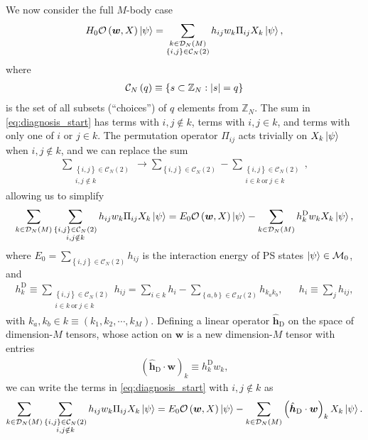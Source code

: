 \documentclass[nofootinbib,notitlepage,11pt]{revtex4-2}
\renewcommand{\t}{\text} %
\newcommand{\p}[1]{\left(#1\right)} %
\renewcommand{\set}[1]{\left\{#1\right\}} %
\renewcommand{\c}{\cdot} %
\newcommand{\m}{\bm} %
\newcommand{\1}{\mathds{1}}
\renewcommand{\i}{\mathrm{i}\mkern1mu}
\newcommand{\C}{\mathcal{C}}
\newcommand{\D}{\mathcal{D}}
\newcommand{\M}{\mathcal{M}}
\renewcommand{\O}{\mathcal{O}}
\newcommand{\ZZ}{\mathbb{Z}}
\begin{document}
We now consider the full $M$-body case
\begin{align}
  H_0 \O\p{\m w,X} \ket\psi
  = \sum_{\substack{k\in\D_N\p{M}\\\set{i,j}\in\C_N\p{2}}}
  h_{ij} w_k \Pi_{ij} X_k \ket\psi,
  \label{eq:diagnosis_start}
\end{align}
where
\begin{align}
  \C_N\p{q} \equiv \set{ s \subset \ZZ_N : \abs{s} = q }
  \label{eq:choices}
\end{align}
is the set of all subsets (``choices'') of $q$ elements from $\ZZ_N$.
The sum in \eqref{eq:diagnosis_start} has terms with $i,j\notin k$,
terms with $i,j\in k$, and terms with only one of $i$ or $j\in k$.
The permutation operator $\Pi_{ij}$ acts trivially on $X_k\ket\psi$
when $i,j\notin k$, and we can replace the sum
\begin{align}
  \sum_{\substack{\set{i,j}\in\C_N\p{2}\\i,j\notin k}}
  \to \sum_{\set{i,j}\in\C_N\p{2}}
  - \sum_{\substack{\set{i,j}\in\C_N\p{2}\\i\in k~\t{or}~j\in k}},
\end{align}
allowing us to simplify
\begin{align}
  \sum_{k\in\D_N\p{M}} \sum_{\substack{\set{i,j}\in\C_N\p{2}\\i,j\notin k}}
  h_{ij} w_k \Pi_{ij} X_k \ket\psi
  = E_0 \O\p{\m w,X} \ket\psi
  - \sum_{k\in\D_N\p{M}} h^{\t{D}}_k w_k X_k \ket\psi,
\end{align}
where $E_0 = \sum_{\set{i,j}\in\C_N\p{2}} h_{ij}$ is the interaction
energy of PS states $\ket\psi\in\M_0$, and
\begin{align}
  h^{\t{D}}_k \equiv
  \sum_{\substack{\set{i,j}\in\C_N\p{2}\\i\in k~\t{or}~j\in k}} h_{ij}
  = \sum_{i\in k} h_i - \sum_{\set{a,b}\in\C_M\p{2}} h_{k_ak_b},
  &&
  h_i \equiv \sum_j h_{ij},
  \label{eq:multi_body_op_diag_element}
\end{align}
with $k_a,k_b\in k\equiv\p{k_1,k_2,\cdots,k_M}$.  Defining a linear
operator $\hat{\m h}_{\t{D}}$ on the space of dimension-$M$ tensors,
whose action on $\m w$ is a new dimension-$M$ tensor with entries
\begin{align}
  \p{\hat{\m h}_{\t{D}}\c\m w}_k \equiv h^{\t{D}}_k w_k,
  \label{eq:multi_body_op_diag}
\end{align}
we can write the terms in \eqref{eq:diagnosis_start} with
$i,j\notin k$ as
\begin{align}
  \sum_{k\in\D_N\p{M}} \sum_{\substack{\set{i,j}\in\C_N\p{2}\\i,j\notin k}}
  h_{ij} w_k \Pi_{ij} X_k \ket\psi
  = E_0 \O\p{\m w,X} \ket\psi
  - \sum_{k\in\D_N\p{M}} \p{\hat{\m h}_{\t{D}}\c\m w}_k X_k \ket\psi.
\end{align}
\end{document}
